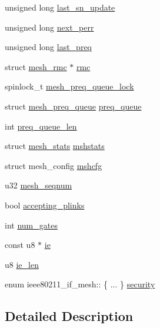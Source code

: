 \begin{DoxyCompactItemize}
unsigned long \hyperlink{structieee80211__if__mesh_a7f98e84dc24836f077044eb5e00e78f1}{last\-\_\-sn\-\_\-update}
\item 
unsigned long \hyperlink{structieee80211__if__mesh_ae90d36efd492fcfe01281116836def4b}{next\-\_\-perr}
\item 
unsigned long \hyperlink{structieee80211__if__mesh_a62360839e8d0d87871320ad614778d68}{last\-\_\-preq}
\item 
struct \hyperlink{structmesh__rmc}{mesh\-\_\-rmc} $\ast$ \hyperlink{structieee80211__if__mesh_a41a923e5b48f47e8ee460387dc5dc673}{rmc}
\item 
spinlock\-\_\-t \hyperlink{structieee80211__if__mesh_a38a1a735de11766717875f1e40ae6ca7}{mesh\-\_\-preq\-\_\-queue\-\_\-lock}
\item 
struct \hyperlink{structmesh__preq__queue}{mesh\-\_\-preq\-\_\-queue} \hyperlink{structieee80211__if__mesh_ad73838a40d5e3d10af379c4fc37d4dfd}{preq\-\_\-queue}
\item 
int \hyperlink{structieee80211__if__mesh_a24b4255901094231004e9da5de02341c}{preq\-\_\-queue\-\_\-len}
\item 
struct \hyperlink{structmesh__stats}{mesh\-\_\-stats} \hyperlink{structieee80211__if__mesh_a63aef80a54bf42d120b10d0b637b57be}{mshstats}
\item 
struct mesh\-\_\-config \hyperlink{structieee80211__if__mesh_a7b25051eee4817560f5bcb80402751f5}{mshcfg}
\item 
u32 \hyperlink{structieee80211__if__mesh_aa5e6ec48251f030a59d356caac4db5ec}{mesh\-\_\-seqnum}
\item 
bool \hyperlink{structieee80211__if__mesh_a27b3535c857149e70e4b9c973719ad7b}{accepting\-\_\-plinks}
\item 
int \hyperlink{structieee80211__if__mesh_af6554718fdcf2fe36e9eed14cc159ebf}{num\-\_\-gates}
\item 
const u8 $\ast$ \hyperlink{structieee80211__if__mesh_a74b4af5de0da224d9fb8b59a3aec207e}{ie}
\item 
u8 \hyperlink{structieee80211__if__mesh_a8e143706c80e5faf90dc4a385c4517f6}{ie\-\_\-len}
\item 
enum ieee80211\-\_\-if\-\_\-mesh\-:: \{ ... \}  \hyperlink{structieee80211__if__mesh_a268036aaf659e69fd41622af680bc598}{security}
\end{DoxyCompactItemize}


\subsection{Detailed Description}


